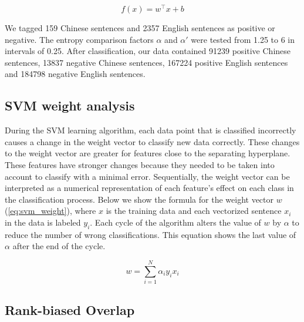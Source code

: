 \documentclass[smallextended,natbib]{svjour3}       %
\begin{document}
    \begin{equation}\label{eq:svm1}
    f(x) = w^\top x + b
    \end{equation}


    We tagged 159 Chinese sentences and \num[group-separator={,}]{2357} English sentences as positive or negative. The entropy comparison factors \(\alpha\) and \(\alpha'\) were tested from 1.25 to 6 in intervals of 0.25. After classification, our data contained \num[group-separator={,}]{91239} positive Chinese sentences, \num[group-separator={,}]{13837} negative Chinese sentences, \num[group-separator={,}]{167224} positive English sentences and \num[group-separator={,}]{184798} negative English sentences. 

  \subsection{SVM weight analysis}\label{svmweightsanalysis}

    During the SVM learning algorithm, each data point that is classified incorrectly causes a change in the weight vector to classify new data correctly. These changes to the weight vector are greater for features close to the separating hyperplane. These features have stronger changes because they needed to be taken into account to classify with a minimal error. Sequentially, the weight vector can be interpreted as a numerical representation of each feature's effect on each class in the classification process. Below we show the formula for the weight vector \(w\) (\ref{eq:svm_weight}), where \(x\) is the training data and each vectorized sentence \(x_i\) in the data is labeled \(y_i\). Each cycle of the algorithm alters the value of \(w\) by \(\alpha\) to reduce the number of wrong classifications. This equation shows the last value of \(\alpha\) after the end of the cycle.

    \begin{equation}\label{eq:svm_weight}
    w = \sum_{i=1}^N \alpha_i y_i x_i
    \end{equation}

    \subsection{Rank-biased Overlap}\label{rbo}
\end{document}
